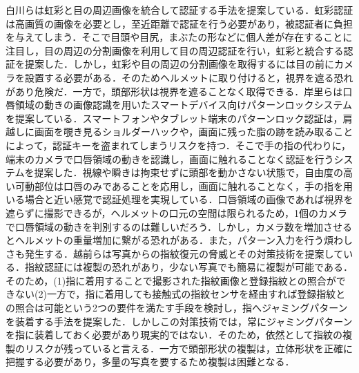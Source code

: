 \documentclass[Japanese]{dicomopapers}
\begin{document}
白川らは虹彩と目の周辺画像を統合して認証する手法を提案している\cite{iris_eye}．虹彩認証は高画質の画像を必要とし，至近距離で認証を行う必要があり，被認証者に負担を与えてしまう．そこで目頭や目尻，まぶたの形などに個人差が存在することに注目し，目の周辺の分割画像を利用して目の周辺認証を行い，虹彩と統合する認証を提案した．しかし，虹彩や目の周辺の分割画像を取得するには目の前にカメラを設置する必要がある．そのためヘルメットに取り付けると，視界を遮る恐れがあり危険だ．一方で，頭部形状は視界を遮ることなく取得できる．岸里らは口唇領域の動きの画像認識を用いたスマートデバイス向けパターンロックシステムを提案している\cite{mouth_pattern}．スマートフォンやタブレット端末のパターンロック認証は，肩越しに画面を覗き見るショルダーハックや，画面に残った脂の跡を読み取ることによって，認証キーを盗まれてしまうリスクを持つ．そこで手の指の代わりに，端末のカメラで口唇領域の動きを認識し，画面に触れることなく認証を行うシステムを提案した．視線や瞬きは拘束せずに頭部を動かさない状態で，自由度の高い可動部位は口唇のみであることを応用し，画面に触れることなく，手の指を用いる場合と近い感覚で認証処理を実現している．口唇領域の画像であれば視界を遮らずに撮影できるが，ヘルメットの口元の空間は限られるため，1個のカメラで口唇領域の動きを判別するのは難しいだろう．しかし，カメラ数を増加させるとヘルメットの重量増加に繋がる恐れがある．また，パターン入力を行う煩わしさも発生する．越前らは写真からの指紋復元の脅威とその対策技術を提案している\cite{finger_print}．指紋認証には複製の恐れがあり，少ない写真でも簡易に複製が可能である．そのため，(1)指に着用することで撮影された指紋画像と登録指紋との照合ができない(2)一方で，指に着用しても接触式の指紋センサを経由すれば登録指紋との照合は可能という2つの要件を満たす手段を検討し，指へジャミングパターンを装着する手法を提案した．しかしこの対策技術では，常にジャミングパターンを指に装着しておく必要があり現実的ではない．そのため，依然として指紋の複製のリスクが残っていると言える．一方で頭部形状の複製は，立体形状を正確に把握する必要があり，多量の写真を要するため複製は困難となる．
\end{document}
